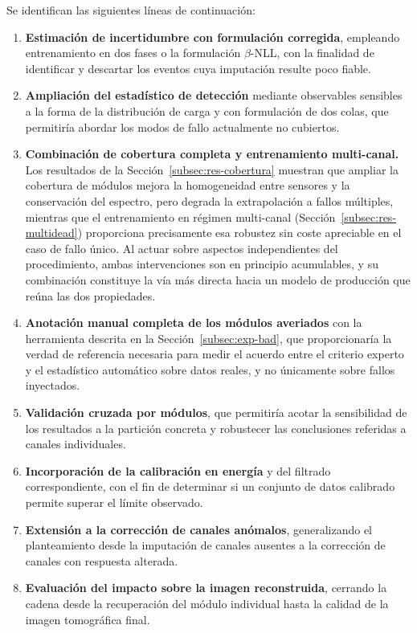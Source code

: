 Se identifican las siguientes líneas de continuación:

\begin{enumerate}
    \item \textbf{Estimación de incertidumbre con formulación corregida}, empleando entrenamiento en
    dos fases o la formulación $\beta$-NLL, con la finalidad de identificar y descartar los eventos
    cuya imputación resulte poco fiable.

    \item \textbf{Ampliación del estadístico de detección} mediante observables sensibles a la forma
    de la distribución de carga y con formulación de dos colas, que permitiría abordar los modos de
    fallo actualmente no cubiertos.

    \item \textbf{Combinación de cobertura completa y entrenamiento multi-canal.} Los resultados de
    la Sección~\ref{subsec:res-cobertura} muestran que ampliar la cobertura de módulos mejora la
    homogeneidad entre sensores y la conservación del espectro, pero degrada la extrapolación a
    fallos múltiples, mientras que el entrenamiento en régimen multi-canal
    (Sección~\ref{subsec:res-multidead}) proporciona precisamente esa robustez sin coste apreciable
    en el caso de fallo único. Al actuar sobre aspectos independientes del procedimiento, ambas
    intervenciones son en principio acumulables, y su combinación constituye la vía más directa
    hacia un modelo de producción que reúna las dos propiedades.

    \item \textbf{Anotación manual completa de los módulos averiados} con la herramienta descrita en
    la Sección~\ref{subsec:exp-bad}, que proporcionaría la verdad de referencia necesaria para medir
    el acuerdo entre el criterio experto y el estadístico automático sobre datos reales, y no
    únicamente sobre fallos inyectados.

    \item \textbf{Validación cruzada por módulos}, que permitiría acotar la sensibilidad de los
    resultados a la partición concreta y robustecer las conclusiones referidas a canales
    individuales.

    \item \textbf{Incorporación de la calibración en energía} y del filtrado correspondiente, con el
    fin de determinar si un conjunto de datos calibrado permite superar el límite observado.

    \item \textbf{Extensión a la corrección de canales anómalos}, generalizando el planteamiento
    desde la imputación de canales ausentes a la corrección de canales con respuesta alterada.

    \item \textbf{Evaluación del impacto sobre la imagen reconstruida}, cerrando la cadena desde la
    recuperación del módulo individual hasta la calidad de la imagen tomográfica final.
\end{enumerate}

